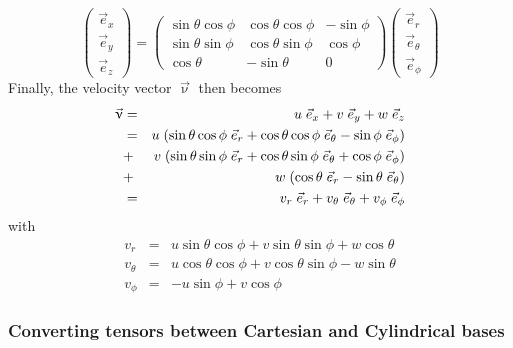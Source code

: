 \[
\left(
\begin{array}{c}
\vec{e}_{x} \\ \vec{e}_y \\ \vec{e}_z
\end{array}
\right)
=
\left(
\begin{array}{ccc}
\sin\theta \cos\phi & \cos\theta\cos\phi & -\sin\phi  \\
\sin\theta \sin\phi & \cos\theta\sin\phi & \cos\phi \\
\cos\theta & -\sin\theta & 0
\end{array}
\right)
\left(
\begin{array}{c}
\vec{e}_{r} \\ \vec{e}_\theta \\ \vec{e}_\phi
\end{array}
\right)
\]
Finally, the velocity vector $\vec{\upnu}$ then becomes
\begin{eqnarray}
\vec{\upnu} 
&=& u\; \vec{e}_x + v \; \vec{e}_y + w \; \vec{e}_z \nonumber\\
&=& u\; ( \sin\theta \cos\phi \; \vec{e}_r +  \cos\theta\cos\phi \;  \vec{e}_{\theta} -\sin\phi \; \vec{e}_{\phi} ) \nonumber\\
&+& v\; ( \sin\theta \sin\phi \; \vec{e}_r + \cos\theta\sin\phi \; \vec{e}_\theta  +  \cos\phi \;  \vec{e}_\phi  )  \nonumber\\
&+& w\; ( \cos\theta \; \vec{e}_r   -\sin\theta \; \vec{e}_\theta  ) \nonumber\\
&=& v_r\; \vec{e}_r + v_\theta\; \vec{e}_\theta + v_\phi\; \vec{e}_\phi 
\end{eqnarray}
with 
\begin{eqnarray}
v_r      &=&  u \sin \theta  \cos \phi  + v \sin\theta \sin \phi + w \cos\theta \\
v_\theta &=&  u \cos\theta\cos\phi + v \cos\theta\sin\phi -w \sin\theta   \\
v_\phi   &=& -u \sin\phi  + v \cos\phi  
\end{eqnarray}

\subsubsection{Converting tensors between Cartesian and Cylindrical bases \label{ss:convcartspher}}


